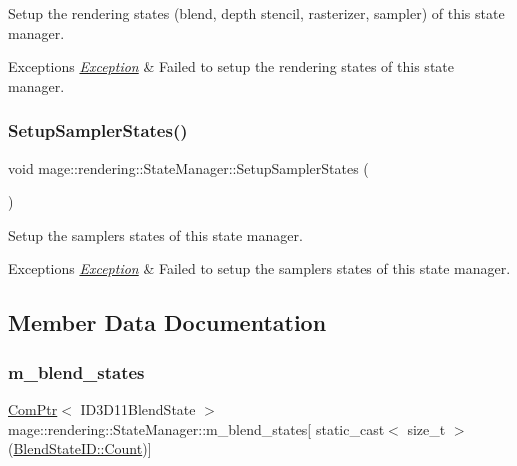Setup the rendering states (blend, depth stencil, rasterizer, sampler) of this state manager.


\begin{DoxyExceptions}{Exceptions}
{\em \hyperlink{classmage_1_1_exception}{Exception}} & Failed to setup the rendering states of this state manager. \\
\hline
\end{DoxyExceptions}
\hypertarget{classmage_1_1rendering_1_1_state_manager_abb74b460f834a402f9ab7527afa64f64}{}\label{classmage_1_1rendering_1_1_state_manager_abb74b460f834a402f9ab7527afa64f64} 
\subsubsection{\texorpdfstring{Setup\+Sampler\+States()}{SetupSamplerStates()}}
{\footnotesize\ttfamily void mage\+::rendering\+::\+State\+Manager\+::\+Setup\+Sampler\+States (\begin{DoxyParamCaption}{ }\end{DoxyParamCaption})\hspace{0.3cm}{\ttfamily [private]}}

Setup the samplers states of this state manager.


\begin{DoxyExceptions}{Exceptions}
{\em \hyperlink{classmage_1_1_exception}{Exception}} & Failed to setup the samplers states of this state manager. \\
\hline
\end{DoxyExceptions}


\subsection{Member Data Documentation}
\hypertarget{classmage_1_1rendering_1_1_state_manager_ad72e83edb0b28b1f03cf8a7dc231587e}{}\label{classmage_1_1rendering_1_1_state_manager_ad72e83edb0b28b1f03cf8a7dc231587e} 
\subsubsection{\texorpdfstring{m\+\_\+blend\+\_\+states}{m\_blend\_states}}
{\footnotesize\ttfamily \hyperlink{namespacemage_ae74f374780900893caa5555d1031fd79}{Com\+Ptr}$<$ I\+D3\+D11\+Blend\+State $>$ mage\+::rendering\+::\+State\+Manager\+::m\+\_\+blend\+\_\+states\mbox{[} static\+\_\+cast$<$ size\+\_\+t $>$(\hyperlink{namespacemage_1_1rendering_abdf11cdb816b9208aec6c3a81f7564abae93f994f01c537c4e2f7d8528c3eb5e9}{Blend\+State\+I\+D\+::\+Count})\mbox{]}\hspace{0.3cm}{\ttfamily [private]}}

